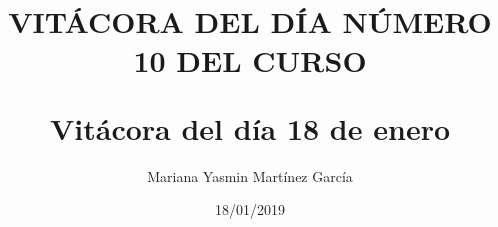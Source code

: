\documentclass{article}
\title{\Huge\item\color{blue}\textbf{VITÁCORA DEL DÍA NÚMERO 10 DEL CURSO}}
\author{\Large Mariana Yasmin Martínez García}
\date{\Large 18/01/2019}
\begin{document}
\begin{figure}[t]
	\centering
	\caption{}
	\label{fig:1}
\end{figure}

	\maketitle
		
	\newpage
	
	\title{\huge\textbf{Vitácora del día 18 de enero\\}} \\
	
\end{document}

